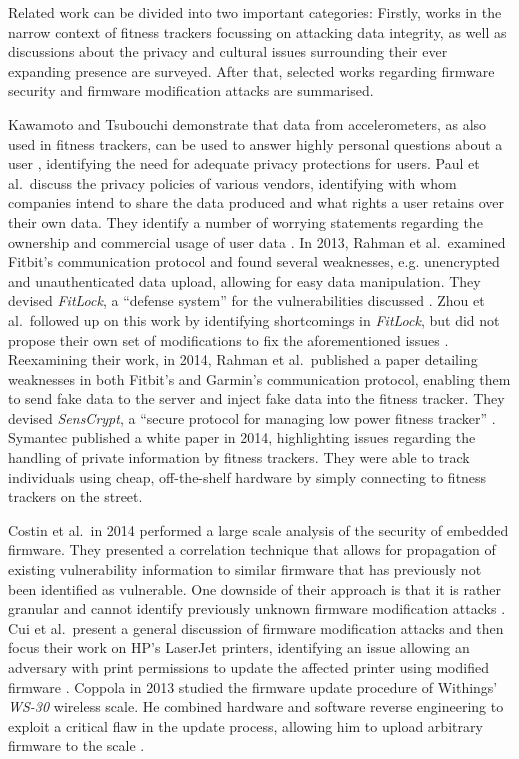 \documentclass[english]{lni}
\begin{document}
Related work can be divided into two important categories: Firstly, works in the narrow context of fitness trackers focussing on attacking data integrity, as well as discussions about the privacy and cultural issues surrounding their ever expanding presence are surveyed.
After that, selected works regarding firmware security and firmware modification attacks are summarised.

Kawamoto and Tsubouchi demonstrate that data from accelerometers, as also used in fitness trackers, can be used to answer highly personal questions about a user \cite{Ka14, tsubouchi2013working}, identifying the need for adequate privacy protections for users.
Paul et al.~discuss the privacy policies of various vendors, identifying with whom companies intend to share the data produced and what rights a user retains over their own data. They identify a number of worrying statements regarding the ownership and commercial usage of user data \cite{Pa14}. In 2013, Rahman et al.~examined Fitbit's communication protocol and found several weaknesses, e.g. unencrypted and unauthenticated data upload, allowing for easy data manipulation. They devised \emph{FitLock}, a ``defense system'' for the vulnerabilities discussed \cite{Rahman13}. Zhou et al.~followed up on this work by identifying shortcomings in \emph{FitLock}, but did not propose their own set of modifications to fix the aforementioned issues \cite{Zhou14}. Reexamining their work, in 2014, Rahman et al.~published a paper detailing weaknesses in both Fitbit's and Garmin's communication protocol, enabling them to send fake data to the server and inject fake data into the fitness tracker. They devised \emph{SensCrypt}, a ``secure protocol for managing low power fitness tracker'' \cite{Rahman14}. Symantec published a white paper in 2014, highlighting issues regarding the handling of private information by fitness trackers. They were able to track individuals using cheap, off-the-shelf hardware by simply connecting to fitness trackers on the street.

Costin et al.~in 2014 performed a large scale analysis of the security of embedded firmware. They presented a correlation technique that allows for propagation of existing vulnerability information to similar firmware that has previously not been identified as vulnerable. One downside of their approach is that it is rather granular and cannot identify previously unknown firmware modification attacks \cite{Costin14}. Cui et al.~present a general discussion of firmware modification attacks and then focus their work on HP's LaserJet printers, identifying an issue allowing an adversary with print permissions to update the affected printer using modified firmware \cite{CuiCS13}. Coppola in 2013 studied the firmware update procedure of Withings' \emph{WS-30} wireless scale. He combined hardware and software reverse engineering to exploit a critical flaw in the update process, allowing him to upload arbitrary firmware to the scale \cite{Coppola}.
\end{document}
